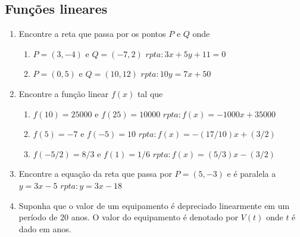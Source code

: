 \documentclass[11pt]{article}
\begin{document}
    \subsection{Funções lineares}
     \begin{enumerate}
     \item Encontre a reta que passa por os pontos 
     $P$ e $Q$ onde 
        \begin{enumerate}
        \item $P=(3,-4)$ e $Q=(-7,2)$   
              \hfill $rpta: 3x+5y+11=0$                             
        \item $P=(0,5)$ e $Q=(10,12)$   
              \hfill $rpta: 10y=7x+50$                                   
        \end{enumerate}
      \item Encontre a função linear $f(x)$ tal que 
        \begin{enumerate}
        \item $f(10)=25 000$ e $f(25)=10 000$   
              \hfill $rpta: f(x)=-1000 x+35 000$                             
        \item $f(5)=-7$ e $f(-5)=10$   
              \hfill $rpta: f(x)=-(17/10)x+(3/2)$                             
        \item $f(-5/2)=8/3$ e $f(1)=1/6$   
              \hfill $rpta: f(x)=(5/3)x-(3/2)$                             
        \end{enumerate}
      \item Encontre a equação da reta que passa por $P=(5,-3)$     e é paralela a $y=3x-5$ \hfill $rpta: y=3x-18$
     \item Suponha que o valor de um equipamento é depreciado linearmente em um período de 20 anos. O valor do equipamento é denotado por $V(t)$ onde $t$ é dado em anos.
     

\end{enumerate}
\end{document}
